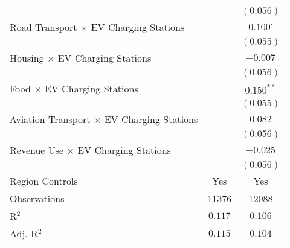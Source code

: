 \begin{center}
\begin{tiny}
\begin{longtable}{l@{} c@{} c@{}}
                                                         &                  & $(0.056)$        \\
\quad Road Transport $\times$ EV Charging Stations       &                  & $0.100^{\cdot}$  \\
                                                         &                  & $(0.055)$        \\
\quad Housing $\times$ EV Charging Stations              &                  & $-0.007$         \\
                                                         &                  & $(0.056)$        \\
\quad Food $\times$ EV Charging Stations                 &                  & $0.150^{**}$     \\
                                                         &                  & $(0.055)$        \\
\quad Aviation Transport $\times$ EV Charging Stations   &                  & $0.082$          \\
                                                         &                  & $(0.056)$        \\
\quad Revenue Use $\times$ EV Charging Stations          &                  & $-0.025$         \\
                                                         &                  & $(0.056)$        \\
\hline
Region Controls                                          & Yes              & Yes              \\
Observations                                             & 11376            & 12088            \\
R$^2$                                                    & $0.117$          & $0.106$          \\
Adj. R$^2$                                               & $0.115$          & $0.104$          \\
\end{longtable}
\end{tiny}
\end{center}
